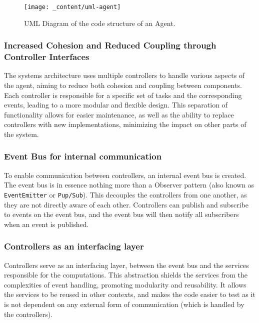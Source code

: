 \begin{figure}[H]
    \centering
    \texttt{[image: \_content/uml-agent]}
    \caption{UML Diagram of the code structure of an Agent.}
    \label{fig:uml-agent}
\end{figure}

\subsubsection{Increased Cohesion and Reduced Coupling through Controller Interfaces}
\label{sssec:reduced-cohesion-coupling}
The systems architecture uses multiple controllers to handle various aspects of the agent, aiming to reduce both cohesion and coupling between components. Each controller is responsible for a specific set of tasks and the corresponding events, leading to a more modular and flexible design. This separation of functionality allows for easier maintenance, as well as the ability to replace controllers with new implementations, minimizing the impact on other parts of the system.

\subsubsection{Event Bus for internal communication}
\label{sssec:event-bus}
To enable communication between controllers, an internal event bus is created. The event bus is in essence nothing more than a Observer pattern (also known as \texttt{EventEmitter} or \texttt{Pup/Sub}). This decouples the controllers from one another, as they are not directly aware of each other. Controllers can publish and subscribe to events on the event bus, and the event bus will then notify all subscribers when an event is published. 

\subsubsection{Controllers as an interfacing layer}
\label{sssec:controllers-interfacing-layer}
Controllers serve as an interfacing layer, between the event bus and the services responsible for the computations. This abstraction shields the services from the complexities of event handling, promoting modularity and reusability. It allows the services to be reused in other contexts, and makes the code easier to test as it is not dependent on any external form of communication (which is handled by the controllers).

